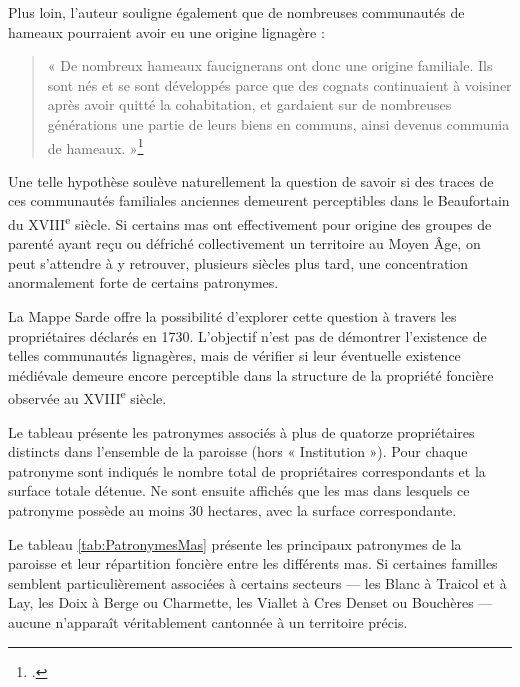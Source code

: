 \documentclass[12pt,a4paper]{report}
\begin{document}
Plus loin, l'auteur souligne également que de nombreuses communautés de hameaux pourraient avoir eu une origine lignagère :

\begin{quote}
	« De nombreux hameaux faucignerans ont donc une origine familiale. Ils sont nés et se sont développés parce que des cognats continuaient à voisiner après avoir quitté la cohabitation, et gardaient sur de nombreuses générations une partie de leurs biens en communs, ainsi devenus communia de hameaux. »\footcite[247-248]{Carrier2001VieMontagnardeFaucigny}
\end{quote}

Une telle hypothèse soulève naturellement la question de savoir si des traces de ces communautés familiales anciennes demeurent perceptibles dans le Beaufortain du XVIII\textsuperscript{e} siècle. Si certains mas ont effectivement pour origine des groupes de parenté ayant reçu ou défriché collectivement un territoire au Moyen Âge, on peut s'attendre à y retrouver, plusieurs siècles plus tard, une concentration anormalement forte de certains patronymes.

La Mappe Sarde offre la possibilité d'explorer cette question à travers les propriétaires déclarés en 1730. L'objectif n'est pas de démontrer l'existence de telles communautés lignagères, mais de vérifier si leur éventuelle existence médiévale demeure encore perceptible dans la structure de la propriété foncière observée au XVIII\textsuperscript{e} siècle.

\begin{table}[H]
	\centering
	
	\caption{Principaux patronymes et répartition par mas}
	\label{tab:PatronymesMas}
\end{table}

Le tableau présente les patronymes associés à plus de quatorze propriétaires distincts dans l'ensemble de la paroisse (hors « Institution »). Pour chaque patronyme sont indiqués le nombre total de propriétaires correspondants et la surface totale détenue. Ne sont ensuite affichés que les mas dans lesquels ce patronyme possède au moins 30 hectares, avec la surface correspondante.

Le tableau \ref{tab:PatronymesMas} présente les principaux patronymes de la paroisse et leur répartition foncière entre les différents mas. Si certaines familles semblent particulièrement associées à certains secteurs — les Blanc à Traicol et à Lay, les Doix à Berge ou Charmette, les Viallet à Cres Denset ou Bouchères — aucune n'apparaît véritablement cantonnée à un territoire précis.
\end{document}
